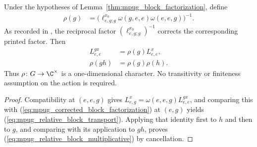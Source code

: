 \begin{lemma}
    \label{thm:mpug_relative_block_character}
    \leanok
    Under the hypotheses of Lemma~\ref{thm:mpug_block_factorization}, define
    \begin{align}
        \rho(g)
         & =\bigl(\ell^{x_0}_{e,g;g}\omega(g,e,e)
        \omega(e,e,g)\bigr)^{-1}.
        \label{eq:mpug_relative_block_character}
    \end{align}
    As recorded in \cite{gap:fbc25_block_independence_reciprocal_errors}, the
    reciprocal factor $(\ell^{x_0}_{e,g;g})^{-1}$ corrects the corresponding
    printed factor. Then
    \begin{align}
        L^{g x}_{e,e}
         & =\rho(g)L^x_{e,e},
        \label{eq:mpug_relative_block_transport} \\
        \rho(gh)
         & =\rho(g)\rho(h).
        \label{eq:mpug_relative_block_multiplicative}
    \end{align}
    Thus $\rho\colon G\to\C^\times$ is a one-dimensional character. No
    transitivity or finiteness assumption on the action is required.
\end{lemma}

\begin{proof}\leanok
    Compatibility at $(e,e,g)$ gives
    $L^x_{e,g}=\omega(e,e,g)L^{g x}_{e,e}$, and comparing this with
    (\ref{eq:mpug_corrected_block_factorization}) at $(e,g)$ yields
    (\ref{eq:mpug_relative_block_transport}). Applying that identity first
    to $h$ and then to $g$, and comparing with its application to $gh$, proves
    (\ref{eq:mpug_relative_block_multiplicative}) by cancellation.
\end{proof}

